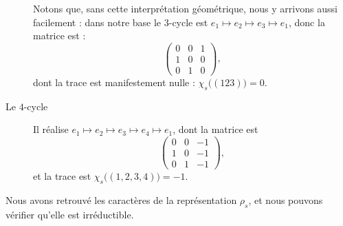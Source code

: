 \begin{description}
		Notons que, sans cette interprétation géométrique, nous y arrivons aussi facilement : dans notre base le \( 3\)-cycle est \( e_1\mapsto e_2\mapsto e_3\mapsto e_1\), donc la matrice est :
		\begin{equation}
			\begin{pmatrix}
				0 & 0 & 1 \\
				1 & 0 & 0 \\
				0 & 1 & 0
			\end{pmatrix},
		\end{equation}
		dont la trace est manifestement nulle : \( \chi_s\big( (123) \big)=0\).

	\item[Le \( 4\)-cycle]

		Il réalise \( e_1\mapsto e_2\mapsto e_3\mapsto e_4\mapsto e_1\), dont la matrice est
		\begin{equation}        \label{EQooONDUooYlduup}
			\begin{pmatrix}
				0 & 0 & -1 \\
				1 & 0 & -1 \\
				0 & 1 & -1
			\end{pmatrix},
		\end{equation}
		et la trace est \( \chi_s\big( (1,2,3,4) \big)=-1\).
\end{description}
Nous avons retrouvé les caractères de la représentation \( \rho_s\), et nous pouvons vérifier qu'elle est irréductible.
